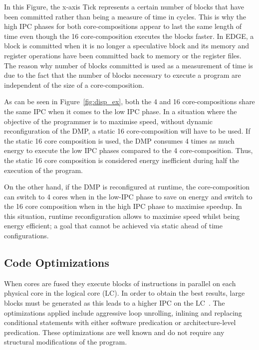 In this Figure, the x-axis Tick represents a certain number of blocks that have been committed rather than being a measure of time in cycles.
This is why the high IPC phases for both core-compositions appear to last the same length of time even though the 16 core-composition executes the blocks faster.
In EDGE, a block is committed when it is no longer a speculative block and its memory and register operations have been committed back to memory or the register files.
The reason why number of blocks committed is used as a measurement of time is due to the fact that the number of blocks necessary to execute a program are independent of the size of a core-composition.

As can be seen in Figure~\ref{fig:disp_ex}, both the 4 and 16 core-compositions share the same IPC when it comes to the low IPC phase.
In a situation where the objective of the programmer is to maximise speed, without dynamic reconfiguration of the DMP, a static 16 core-composition will have to be used.
If the static 16 core composition is used, the DMP consumes 4 times as much energy to execute the low IPC phases compared to the 4 core-composition.
Thus, the static 16 core composition is considered energy inefficient during half the execution of the program.

On the other hand, if the DMP is reconfigured at runtime, the core-composition can switch to 4 cores when in the low-IPC phase to save on energy and switch to the 16 core composition when in the high IPC phase to maximise speedup.
In this situation, runtime reconfiguration allows to maximise speed whilst being energy efficient; a goal that cannot be achieved via static ahead of time configurations.

\subsection{Code Optimizations}
When cores are fused they execute blocks of instructions in parallel on each physical core in the logical core (LC).
In order to obtain the best results, large blocks must be generated as this leads to a higher IPC on the LC~\cite{micolet2016dmpstream}.
The optimizations applied include aggressive loop unrolling, inlining and replacing conditional statements with either software predication or architecture-level predication.
These optimizations are well known and do not require any structural modifications of the program.

